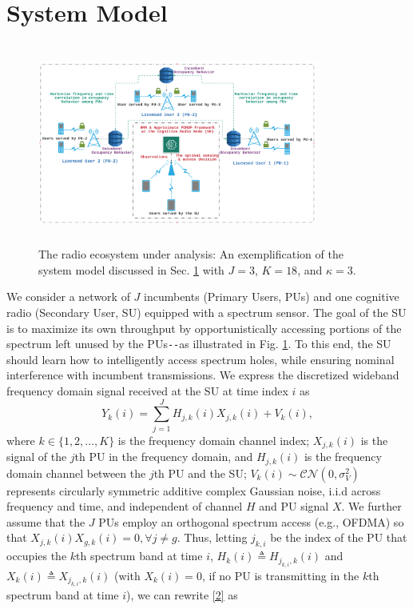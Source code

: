 \documentclass[10pt,twocolumn]{IEEEtran}
\begin{document}
\section{System Model}\label{II}
\begin{figure}
    \centering
    \includegraphics[width=92mm, height=66mm]{System_Model.png}
    \caption{The radio ecosystem under analysis: An exemplification of the system model discussed in Sec. \ref{II} with $J{=}3$, $K{=}18$, and $\kappa{=}3$.}
    \label{fig:0}
\end{figure}
We consider a network of $J$ incumbents (Primary Users, PUs) and one cognitive radio (Secondary User, SU) equipped with a spectrum sensor. The goal of the SU is to maximize its own throughput by opportunistically accessing portions of the spectrum left unused by the PUs\texttt{-{}-}as illustrated in Fig. \ref{fig:0}. To this end, the SU should learn how to intelligently access spectrum holes, while ensuring nominal interference with incumbent transmissions.
We express the discretized wideband frequency domain signal received at the SU
at time index $i$ as
\begin{equation}\label{2}
    Y_k(i) = \sum_{j=1}^{J} H_{j,k}(i)X_{j,k}(i) + V_k(i),
\end{equation}
where  $k {\in} \{1,2,\dots,K\}$
is the frequency domain channel index; $X_{j,k}(i)$ is the signal of the $j$th PU in the frequency domain, and $H_{j,k}(i)$ is the frequency domain channel between the $j$th PU and the SU; $V_k(i) {\sim} \mathcal{CN}(0,\sigma_V^2)$ represents circularly symmetric additive complex Gaussian noise, i.i.d across frequency and time, and independent of channel $H$ and PU signal $X$. We further assume that the $J$ PUs employ an orthogonal spectrum access (e.g., OFDMA) so that $X_{j,k}(i)X_{g,k}(i){=}0, \forall j{\neq}g$. Thus, letting $j_{k,i}$ be the index of the PU that occupies the $k$th spectrum band at time $i$, $H_{k}(i){\triangleq}H_{j_{k,i},k}(i)$ and $X_{k}(i){\triangleq}X_{j_{k,i},k}(i)$ (with $X_{k}(i){=}0$, if no PU is transmitting in the $k$th spectrum band at time $i$), we can rewrite \eqref{2} as 
\end{document}
